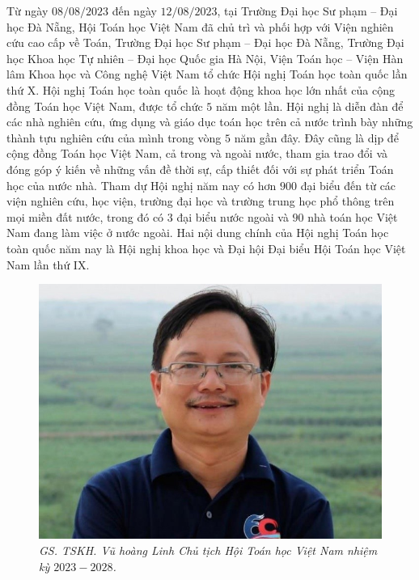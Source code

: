 \begin{multicols}{2}	
	Từ ngày $08/08/2023$ đến ngày $12/08/2023$, tại Trường Đại học Sư phạm -- Đại học Đà Nẵng, Hội Toán học Việt Nam đã chủ trì và phối hợp với Viện nghiên cứu cao cấp về Toán, Trường Đại học Sư phạm -- Đại học Đà Nẵng, Trường Đại học Khoa học Tự nhiên -- Đại học Quốc gia Hà Nội, Viện Toán học -- Viện Hàn lâm Khoa học và Công nghệ Việt Nam tổ chức Hội nghị Toán học toàn quốc lần thứ X.
	\vskip 0.1cm
	Hội nghị Toán học toàn quốc là hoạt động khoa học lớn nhất của cộng đồng Toán học Việt Nam, được tổ chức $5$ năm một lần. Hội nghị là diễn đàn để các nhà nghiên cứu, ứng dụng và giáo dục toán học trên cả nước trình bày những thành tựu nghiên cứu của mình trong vòng $5$ năm gần đây. Đây cũng là dịp để cộng đồng Toán học Việt Nam, cả trong và ngoài nước, tham gia trao đổi và đóng góp ý kiến về những vấn đề thời sự, cấp thiết đối với sự phát triển Toán học của nước nhà. Tham dự Hội nghị năm nay có hơn $900$ đại biểu đến từ các viện nghiên cứu, học viện, trường đại học và trường trung học phổ thông trên mọi miền đất nước, trong đó có $3$ đại biểu nước ngoài và $90$ nhà toán học Việt Nam đang làm việc ở nước ngoài. Hai nội dung chính của Hội nghị Toán học toàn quốc năm nay là Hội nghị khoa học và Đại hội Đại biểu Hội Toán học Việt Nam lần thứ IX.
	\begin{figure}[H]
		\vspace*{-5pt}
		\centering
		\captionsetup{labelformat= empty, justification=centering}
		\includegraphics[width= 1\linewidth]{2}
		\caption{\small\textit{\color{doisongtoanhoc}GS. TSKH. Vũ hoàng Linh Chủ tịch Hội Toán học Việt Nam nhiệm kỳ $2023-2028$.}}
		\vspace*{-10pt}

\end{figure}
\end{multicols}

